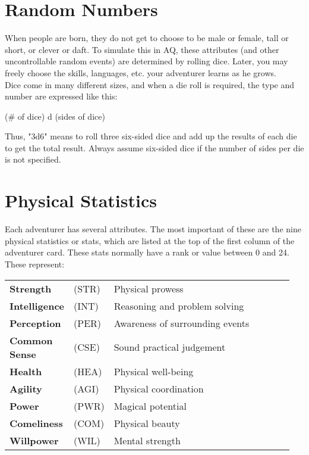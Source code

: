 \begin{multicols*}{2}
\section{Random Numbers}
When people are born, they do not get to choose to be male or female, tall or short, or clever or daft. To simulate this in AQ, these attributes (and other uncontrollable random events) are determined by rolling dice. Later, you may freely choose the skills, languages, etc. your adventurer learns as he grows.\\
Dice come in many different sizes, and when a die roll is required, the type and number are expressed like this:\\
\begin{center}
(\# of dice) d (sides of dice)
\end{center}
Thus, "3d6" means to roll three six-sided dice and add up the results of each die to get the total result. Always assume six-sided dice if the number of sides per die is not specified.
\section{Physical Statistics}
Each adventurer has several attributes. The most important of these are the nine physical statistics or stats, which are listed at the top of the first column of the adventurer card. These stats normally have a rank or value between 0 and 24. These represent:

\noindent\begin{tabular}{@{}p{0.2\linewidth} p{0.1\linewidth} p{0.65\linewidth}}
\textbf{Strength} & (STR) & Physical prowess\\
\textbf{Intelligence} & (INT) & Reasoning and problem solving\\
\textbf{Perception} & (PER) & Awareness of surrounding events\\
\textbf{Common Sense} & (CSE) & Sound practical judgement\\
\textbf{Health} & (HEA) & Physical well-being\\
\textbf{Agility} & (AGI) & Physical coordination\\
\textbf{Power} &  (PWR) &  Magical potential\\
\textbf{Comeliness} & (COM) & Physical beauty\\
\textbf{Willpower} & (WIL) & Mental strength\\
\end{tabular}


\end{multicols*}
